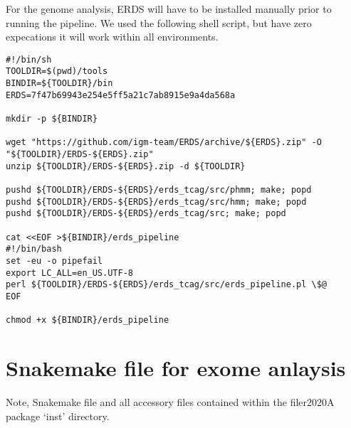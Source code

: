 \documentclass{article}\usepackage[]{graphicx}\usepackage[]{color}
\makeatletter
\newenvironment{kframe}{%
 \def\at@end@of@kframe{}%
 \ifinner\ifhmode%
  \def\at@end@of@kframe{\end{minipage}}%
  \begin{minipage}{\columnwidth}%
 \fi\fi%
 \def\FrameCommand##1{\hskip\@totalleftmargin \hskip-\fboxsep
 \colorbox{shadecolor}{##1}\hskip-\fboxsep
     \hskip-\linewidth \hskip-\@totalleftmargin \hskip\columnwidth}%
 \MakeFramed {\advance\hsize-\width
   \@totalleftmargin\z@ \linewidth\hsize
   \@setminipage}}%
 {\par\unskip\endMakeFramed%
 \at@end@of@kframe}
\newenvironment{knitrout}{}{} %
\makeatother
\begin{document}
For the genome analysis, ERDS will have to be installed manually prior to running the pipeline.
We used the following shell script, but have zero expecations it will work within all environments.

\begin{knitrout}
\color{fgcolor}\begin{kframe}
\begin{verbatim}
#!/bin/sh
TOOLDIR=$(pwd)/tools
BINDIR=${TOOLDIR}/bin
ERDS=7f47b69943e254e5ff5a21c7ab8915e9a4da568a

mkdir -p ${BINDIR}

wget "https://github.com/igm-team/ERDS/archive/${ERDS}.zip" -O "${TOOLDIR}/ERDS-${ERDS}.zip"
unzip ${TOOLDIR}/ERDS-${ERDS}.zip -d ${TOOLDIR}

pushd ${TOOLDIR}/ERDS-${ERDS}/erds_tcag/src/phmm; make; popd
pushd ${TOOLDIR}/ERDS-${ERDS}/erds_tcag/src/hmm; make; popd
pushd ${TOOLDIR}/ERDS-${ERDS}/erds_tcag/src; make; popd

cat <<EOF >${BINDIR}/erds_pipeline
#!/bin/bash
set -eu -o pipefail
export LC_ALL=en_US.UTF-8
perl ${TOOLDIR}/ERDS-${ERDS}/erds_tcag/src/erds_pipeline.pl \$@
EOF

chmod +x ${BINDIR}/erds_pipeline
\end{verbatim}
\end{kframe}
\end{knitrout}

\section{Snakemake file for exome anlaysis}

Note, Snakemake file and all accessory files contained within the filer2020A package `inst' directory.
\end{document}

